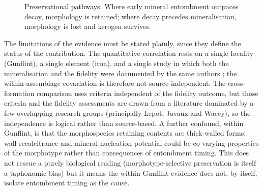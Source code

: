 \documentclass[11pt]{article}
\begin{document}
\begin{figure}[t]
\centering
{}
\caption{Preservational pathways. Where early mineral entombment outpaces decay, morphology is
retained; where decay precedes mineralisation, morphology is lost and kerogen survives.}
\label{fig:model}
\end{figure}

The limitations of the evidence must be stated plainly, since they define the status of the
contribution. The quantitative correlation rests on a single locality (Gunflint), a single element
(iron), and a single study in which both the mineralisation and the fidelity were documented by the
same authors \citep{Lepot2017a}; the within-assemblage covariation is therefore not
source-independent. The cross-formation comparison uses criteria independent of the fidelity outcome,
but those criteria and the fidelity assessments are drawn from a literature dominated by a few
overlapping research groups (principally Lepot, Javaux and Wacey), so the independence is logical rather
than source-based. A further confound, within Gunflint, is that the morphospecies retaining contents
are thick-walled forms: wall recalcitrance and mineral-nucleation potential could be co-varying
properties of the morphotype rather than consequences of entombment timing. This does not rescue a
purely biological reading (morphotype-selective preservation is itself a taphonomic bias) but it
means the within-Gunflint evidence does not, by itself, isolate entombment timing as the cause.
\end{document}
